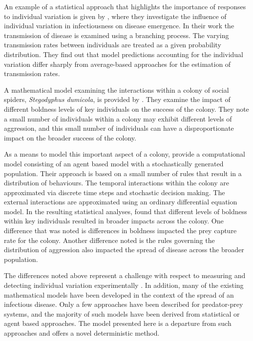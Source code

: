 \documentclass[review,authoryear]{elsarticle}
\begin{document}
An example of a statistical approach that highlights the importance of
responses to individual variation is given by \cite{SuperspreadingLloyd}, where they investigate the influence of individual variation in infectiousness on disease emergence. In their work the transmission of
disease is examined using a branching process. The varying
transmission rates between individuals are treated as a given
probability distribution. They find out that model predictions accounting for the individual variation differ sharply from average-based approaches for the estimation of transmission rates.

A mathematical model examining the interactions within a colony of
social spiders, \textit{Stegodyphus dumicola}, is provided by \cite{doi:10.1086/687235}. They  examine the impact of different boldness levels of
 key individuals on the success of the colony.  They note a small number of individuals within
a colony may exhibit different levels of aggression, and this small
number of individuals can have a disproportionate impact on the
broader success of the colony.

As a means to model this important aspect of a colony, \cite{doi:10.1086/687235} provide a computational model
consisting of an agent based model with a stochastically generated
population. Their approach is based on a small number of rules that
result in a distribution of behaviours. The temporal interactions
within the colony are approximated via discrete time steps and
stochastic decision making. The external interactions are approximated
using an ordinary differential equation model.
In the resulting statistical analyses, \cite{doi:10.1086/687235} found that different levels of boldness
within key individuals resulted in broader impacts across the colony. One difference that was noted is differences in
boldness impacted the prey capture rate for the colony. Another difference noted is
the rules governing the distribution of aggression also impacted the spread of disease across the broader population.

The differences noted above represent a challenge with respect to measuring and detecting individual variation experimentally \cite{doi:10.1037/0735-7036.107.3.250}. In addition, 
many of the existing mathematical models have been
developed in the context of the spread of an infectious disease. Only
a few approaches have been described for predator-prey systems, and
the majority of such models have been derived from statistical or
agent based approaches. The model presented here is a departure from
such approaches and offers a novel deterministic method.
\end{document}
